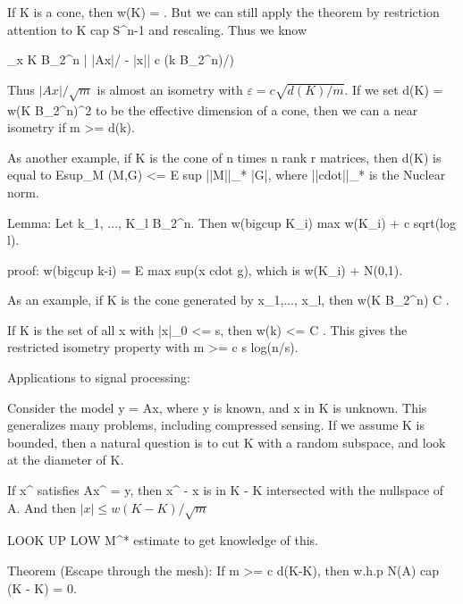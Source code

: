 If K is a cone, then w(K) = \infty. But we can still apply the theorem by restriction attention to K cap S^{n-1} and rescaling. Thus we know

\sup_{x \in K \cap B_2^n} | |Ax|/ - |x|| \leq c \omega(k \cap B_2^n)/)

Thus $|Ax|/\sqrt{m}$ is almost an isometry with $\varepsilon = c \sqrt{d(K)/m}$. If we set d(K) = w(K \cap B_2^n)^2 to be the effective dimension of a cone, then we can a near isometry if m >= d(k). 

As another example, if K is the cone of n times n rank r matrices, then d(K) is equal to Esup_M (M,G) <= E sup ||M||_* |G|, where ||cdot||_* is the Nuclear norm.




Lemma: Let k_1, ..., K_l \subset B_2^n. Then w(bigcup K_i) \leq max w(K_i) + c sqrt(log l).

proof: w(bigcup k-i) = E max sup(x cdot g), which is w(K_i) + N(0,1).

As an example, if K is the cone generated by x_1,..., x_l, then w(K \cap B_2^n) \leq C .

If K is the set of all x with |x|_0 <= s, then w(k) <= C . This gives the restricted isometry property with m >= c s log(n/s).


Applications to signal processing:

Consider the model y = Ax, where y is known, and x in K is unknown. This generalizes many problems, including compressed sensing. If we assume K is bounded, then a natural question is to cut K with a random subspace, and look at the diameter of K.

If x^ satisfies Ax^ = y, then x^ - x is in K - K intersected with the nullspace of A. And then $|x| \leq w(K-K)/\sqrt{m}$

LOOK UP LOW M^* estimate to get knowledge of this.

Theorem (Escape through the mesh): If m >= c d(K-K), then w.h.p N(A) cap (K - K) = {0}.